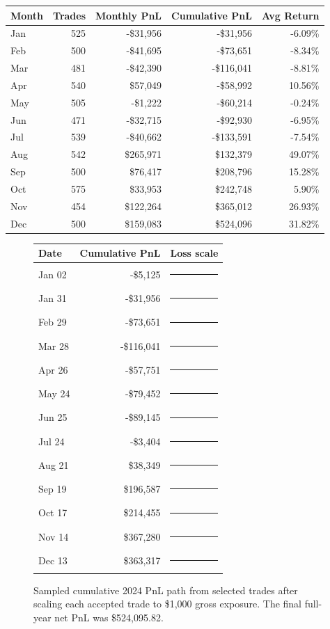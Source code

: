 \documentclass[11pt]{article}
\begin{document}
\begin{center}
\begin{tabular}{@{}lrrrr@{}}
\toprule
Month & Trades & Monthly PnL & Cumulative PnL & Avg Return \\
\midrule
Jan & 525 & -\$31,956 & -\$31,956 & -6.09\% \\
Feb & 500 & -\$41,695 & -\$73,651 & -8.34\% \\
Mar & 481 & -\$42,390 & -\$116,041 & -8.81\% \\
Apr & 540 & \$57,049 & -\$58,992 & 10.56\% \\
May & 505 & -\$1,222 & -\$60,214 & -0.24\% \\
Jun & 471 & -\$32,715 & -\$92,930 & -6.95\% \\
Jul & 539 & -\$40,662 & -\$133,591 & -7.54\% \\
Aug & 542 & \$265,971 & \$132,379 & 49.07\% \\
Sep & 500 & \$76,417 & \$208,796 & 15.28\% \\
Oct & 575 & \$33,953 & \$242,748 & 5.90\% \\
Nov & 454 & \$122,264 & \$365,012 & 26.93\% \\
Dec & 500 & \$159,083 & \$524,096 & 31.82\% \\
\bottomrule
\end{tabular}
\end{center}

\begin{figure}[h]
\centering
\begin{tabular}{@{}lrl@{}}
\toprule
Date & Cumulative PnL & Loss scale \\
\midrule
Jan 02 & -\$5,125 & \textcolor{red}{\rule{0.4cm}{7pt}}\\
Jan 31 & -\$31,956 & \textcolor{red}{\rule{2.8cm}{7pt}}\\
Feb 29 & -\$73,651 & \textcolor{red}{\rule{6.3cm}{7pt}}\\
Mar 28 & -\$116,041 & \textcolor{red}{\rule{10.0cm}{7pt}}\\
Apr 26 & -\$57,751 & \textcolor{red}{\rule{5.0cm}{7pt}}\\
May 24 & -\$79,452 & \textcolor{red}{\rule{6.8cm}{7pt}}\\
Jun 25 & -\$89,145 & \textcolor{red}{\rule{7.7cm}{7pt}}\\
Jul 24 & -\$3,404 & \textcolor{red}{\rule{0.3cm}{7pt}}\\
Aug 21 & \$38,349 & \textcolor{green!50!black}{\rule{1.1cm}{7pt}}\\
Sep 19 & \$196,587 & \textcolor{green!50!black}{\rule{5.4cm}{7pt}}\\
Oct 17 & \$214,455 & \textcolor{green!50!black}{\rule{5.9cm}{7pt}}\\
Nov 14 & \$367,280 & \textcolor{green!50!black}{\rule{10.0cm}{7pt}}\\
Dec 13 & \$363,317 & \textcolor{green!50!black}{\rule{9.9cm}{7pt}}\\
\bottomrule
\end{tabular}
\caption{Sampled cumulative 2024 PnL path from selected trades after scaling each accepted trade to \$1,000 gross exposure. The final full-year net PnL was \$524,095.82.}
\end{figure}
\end{document}
